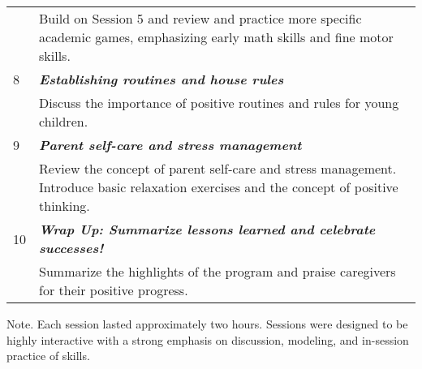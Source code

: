 \begin{table}[H]
{{\begin{threeparttable}
\begin{tabular}{p{0.5in}p{5in}}
    & Build on Session 5 and review and practice more specific academic games, emphasizing early math skills and fine motor skills. \\
  8 & \textbf{\textit{Establishing routines and house rules}} \\
    & Discuss the importance of positive routines and rules for young children. \\
  9 & \textbf{\textit{Parent self-care and stress management}} \\
    & Review the concept of parent self-care and stress management. Introduce basic relaxation exercises and the concept of positive thinking. \\
  10 & \textbf{\textit{Wrap Up: Summarize lessons learned and celebrate successes!}} \\
    & Summarize the highlights of the program and praise caregivers for their positive progress. \\ 
  \bottomrule
  \end{tabular}
  \begin{tablenotes}
  \small
  \item Note. Each session lasted approximately two hours. Sessions were designed to be highly interactive with a strong emphasis on discussion, modeling, and in-session practice of skills.
  \end{tablenotes}
  \end{threeparttable}}}
\end{table}
